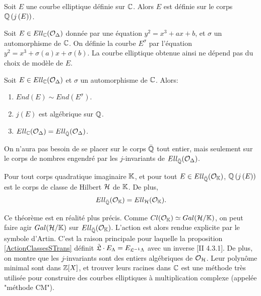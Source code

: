 \begin{Prop}
	Soit $E$ une courbe elliptique définie sur $\mathbb{C}$. Alors $E$ est définie sur le corps $\mathbb{Q}\left( j\left( E\right) \right) $.
\end{Prop}

\begin{Def}
	Soit $E\in Ell_{\mathbb{C}}(\mathcal{O}_{\Delta})$ donnée par une équation $y^2 = x^3 + ax + b$, et $\sigma$ un automorphisme de $\mathbb{C}$. On définie la courbe $E^{\sigma}$ par l'équation $y^2 = x^3 + \sigma(a)x + \sigma(b)$. La courbe elliptique obtenue ainsi ne dépend pas du choix de modèle de $E$. 
\end{Def}

\begin{Prop}
	
	Soit $E\in Ell_{\mathbb{C}}(\mathcal{O}_{\Delta})$ et $\sigma$ un automorphisme de $\mathbb{C}$. Alors:
	\begin{enumerate}
		\item $End(E)\sim End(E^{\sigma})$.
		\item $j(E)$ est algébrique sur $\mathbb{Q}$.
		\item $Ell_{\mathbb{C}}(\mathcal{O}_{\Delta}) = Ell_{\bar{\mathbb{Q}}}(\mathcal{O}_{\Delta})$.
	\end{enumerate}
\end{Prop}

\begin{Rem}
	On n'aura pas besoin de se placer sur le corps $\bar{\mathbb{Q}}$ tout entier, mais seulement sur le corps de nombres engendré par les $j$-invariants de $Ell_{\bar{\mathbb{Q}}}(\mathcal{O}_{\Delta})$. 
\end{Rem}

\begin{The}
	
	Pour tout corps quadratique imaginaire $\mathbb{K}$, et pour tout $E\in Ell_{\bar{\mathbb{Q}}}(\mathcal{O}_{\mathbb{K}})$, $\mathbb{Q}\left( j\left( E\right) \right)$ est le corps de classe de Hilbert $\mathcal{H}$ de $\mathbb{K}$. De plus, 
	\begin{equation*}
		Ell_{\bar{\mathbb{Q}}}(\mathcal{O}_{\mathbb{K}}) = Ell_{\mathcal{H}}(\mathcal{O}_{\mathbb{K}}).
	\end{equation*}
	
\end{The}

\begin{Rem}\label{methodeCM}
	Ce théorème est en réalité plus précis. Comme $Cl(\mathcal{O}_{\mathbb{K}})\simeq Gal(\mathcal{H}/\mathbb{K})$, on peut faire agir $Gal(\mathcal{H}/\mathbb{K})$ sur $Ell_{\bar{\mathbb{Q}}}(\mathcal{O}_{\mathbb{K}})$. L'action est alors rendue explicite par le symbole d'Artin. C'est la raison principale pour laquelle la proposition \ref{ActionClassesSTrans} définit $\tilde{\mathfrak{L}}\cdot E_{\Lambda} = E_{\mathfrak{L}^{-1}\Lambda}$ avec un inverse \cite{Sil94}[II 4.3.1]. De plus, on montre que les $j$-invariants sont des entiers algébriques de $\mathcal{O}_{\mathcal{H}}$. Leur polynôme minimal sont dans $\mathbb{Z}[X]$, et trouver leurs racines dans $\mathbb{C}$ est une méthode très utilisée pour construire des courbes elliptiques à multiplication complexe (appelée "méthode CM").
\end{Rem}


